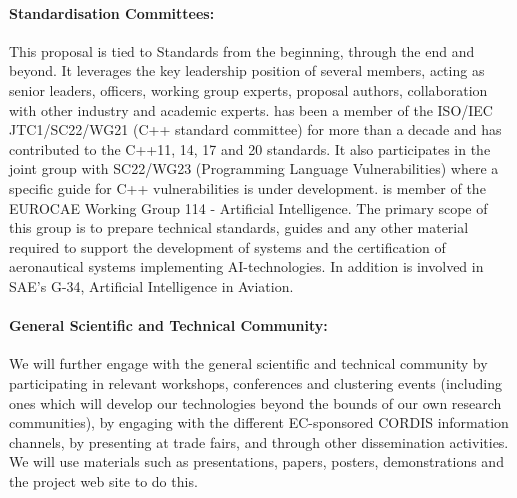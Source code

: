 \documentclass[a4paper,11pt]{article}
\begin{document}
\paragraph{Standardisation Committees:}
This proposal is tied to Standards from the beginning, through the end and beyond. It leverages the key leadership position of several members, acting as senior leaders, officers, working group experts, proposal authors, collaboration with other industry and academic experts.
\UCMshort{} has been a member of the ISO/IEC JTC1/SC22/WG21 (C++ standard committee) for more than a decade and has contributed to the C++11, 14, 17 and 20 standards. It also participates in the joint group with SC22/WG23 (Programming Language Vulnerabilities) where a specific guide for C++ vulnerabilities is under development.
\FRQshort{} is member of the EUROCAE Working Group 114 - Artificial Intelligence. The primary scope of this group is to prepare technical standards, guides and any other material required to support the development of systems and the certification of aeronautical systems implementing AI-technologies. In addition \FRQshort{} is involved in SAE's G-34, Artificial Intelligence in Aviation.

%
%

\paragraph{General Scientific and Technical Community:}
We will further engage with the general scientific and technical community
 by participating in relevant workshops, conferences and clustering events (including ones which
 will develop our technologies beyond the bounds of our own research communities), by engaging with the
 different EC-sponsored CORDIS information channels, by presenting at trade
 fairs, and through other dissemination activities.  We will use materials such as presentations,
 papers,  posters, demonstrations and the project web site to do this.
\end{document}
